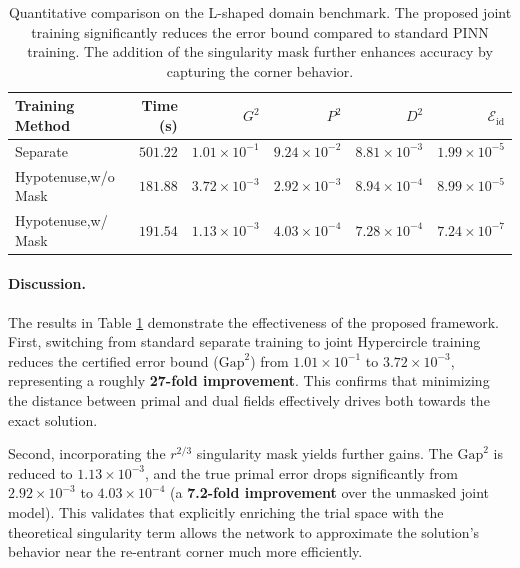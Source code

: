 \documentclass[12pt, a4paper]{article}
\begin{document}
\begin{table}[H]
\centering
\caption{Quantitative comparison on the L-shaped domain benchmark. The proposed joint training significantly reduces the error bound compared to standard PINN training. The addition of the singularity mask further enhances accuracy by capturing the corner behavior.}
\label{tab:lshape}
\renewcommand{\arraystretch}{1.2} %
\begin{tabular}{lrrrrr}
\toprule
Training Method & Time (s) & $G^2$ & $P^2$ & $D^2$ & $\mathcal{E}_{\text{id}}$ \\
\midrule
Separate&
$501.22$ &
$1.01\times 10^{-1}$ &
$9.24\times 10^{-2}$ &
$8.81\times 10^{-3}$ &
$1.99\times 10^{-5}$\\
Hypotenuse,w/o Mask &
$181.88$ &
$3.72\times 10^{-3}$ &
$2.92\times 10^{-3}$ &
$8.94\times 10^{-4}$ &
$8.99\times 10^{-5}$\\
Hypotenuse,w/ Mask &
$191.54$ &
$1.13\times 10^{-3}$ &
$4.03\times 10^{-4}$ &
$7.28\times 10^{-4}$ &
$7.24\times 10^{-7}$\\
\bottomrule
\end{tabular}
\end{table}

\paragraph{Discussion.}
The results in Table \ref{tab:lshape} demonstrate the effectiveness of the proposed framework. 
First, switching from standard separate training to joint Hypercircle training reduces the certified error bound ($\text{Gap}^2$) from $1.01\times 10^{-1}$ to $3.72\times 10^{-3}$, representing a roughly \textbf{27-fold improvement}. This confirms that minimizing the distance between primal and dual fields effectively drives both towards the exact solution.

Second, incorporating the $r^{2/3}$ singularity mask yields further gains. The $\text{Gap}^2$ is reduced to $1.13\times 10^{-3}$, and the true primal error drops significantly from $2.92\times 10^{-3}$ to $4.03\times 10^{-4}$ (a \textbf{7.2-fold improvement} over the unmasked joint model). This validates that explicitly enriching the trial space with the theoretical singularity term allows the network to approximate the solution's behavior near the re-entrant corner much more efficiently.

\end{document}

